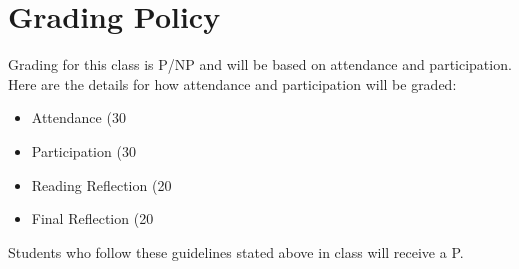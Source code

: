\documentclass{article}
\begin{document}
\section{Grading Policy}
Grading for this class is P/NP and will be based on attendance and participation. Here are the details for how attendance and participation will be graded:
\newline
\begin{itemize}
	\item Attendance (30%
    \item Participation (30%
    \item Reading Reflection (20%
    \item Final Reflection (20%
\end{itemize}
Students who follow these guidelines stated above in class will receive a P.  
\end{document}
